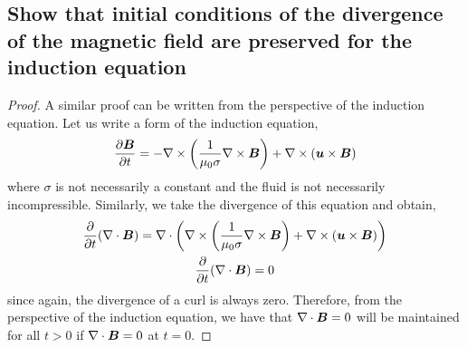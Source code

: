 \documentclass{article}
\begin{document}
\subsection{Show that initial conditions of the divergence of the magnetic field are preserved for the induction equation}

\begin{proof}
    A similar proof can be written from the perspective of the induction
    equation. Let us write a form of the induction equation, 
    \begin{gather*}
        \frac{\partial \boldsymbol{B}}{\partial t} = - \nabla\times\left(\frac{1}{\mu_0\sigma}\nabla\times\boldsymbol{B}\right) + \nabla\times(\boldsymbol{u}\times\boldsymbol{B})
    \end{gather*}
    where $\sigma$ is not necessarily a constant and the fluid is not
    necessarily incompressible. Similarly, we take the divergence of this
    equation and obtain,
    \begin{gather*}
        \frac{\partial }{\partial t}(\nabla \cdot{\boldsymbol{B}})  = \nabla\cdot\left(
        \nabla\times\left(\frac{1}{\mu_0\sigma}\nabla\times\boldsymbol{B}\right) +
        \nabla\times(\boldsymbol{u}\times\boldsymbol{B})\right)\\
        \frac{\partial }{\partial t}(\nabla \cdot{\boldsymbol{B}})  = 0
    \end{gather*}
    since again, the divergence of a curl is always zero. Therefore, from the
    perspective of the induction equation, we have that $\nabla \cdot{\boldsymbol{B}} = 0$ will be
    maintained for all $t>0$ if $\nabla \cdot{\boldsymbol{B}} = 0$ at $t=0$. 
\end{proof}
\end{document}
